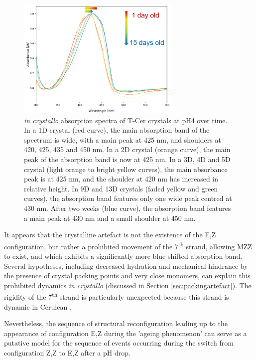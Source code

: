 \begin{figure}[H] %
    \centering
        \noindent \includegraphics[width=0.7\textwidth]{images/T-Cer/ageing_spectra.pdf}
    \hfill
    \caption{\textit{in crystallo} absorption spectra of T-Cer crystals at pH4 over time. In a 1D crystal (red curve), the main absorption band of the spectrum is wide, with a main peak at 425 nm, and shoulders at 420, 425, 435 and 450 nm. In a 2D crystal (orange curve), the main peak of the absorption band is now at 425 nm. In a 3D, 4D and 5D crystal (light orange to bright yellow curves), the main absorbance peak is at 425 nm, and the shoulder at 420 nm has increased in relative height. In 9D and 13D crystals (faded yellow and green curves), the absorption band features only one wide peak centred at 430 nm. After two weeks (blue curve), the absorption band features a main peak at 430 nm and a small shoulder at 450 nm.}
    \label{fig:ageing_spec}
\end{figure}

It appears that the crystalline artefact is not the existence of the E,Z configuration, but rather a prohibited movement of the 7\textsuperscript{th} strand, allowing MZZ to exist, and which exhibits a significantly more blue-shifted absorption band. Several hypotheses, including decreased hydration and mechanical hindrance by the presence of crystal packing points and very close monomers, can explain this prohibited dynamics \textit{in crystallo} (discussed in Section \ref{sec:packingartefact}). The rigidity of the 7\textsuperscript{th} strand is particularly unexpected because this strand is dynamic in Cerulean \parencite{lelimousinIntrinsicDynamicsECFP2009}.

Nevertheless, the sequence of structural reconfiguration leading up to the appearance of configuration E,Z during the 'ageing phenomenon' can serve as a putative model for the sequence of events occurring during the switch from configuration Z,Z to E,Z after a pH drop.

